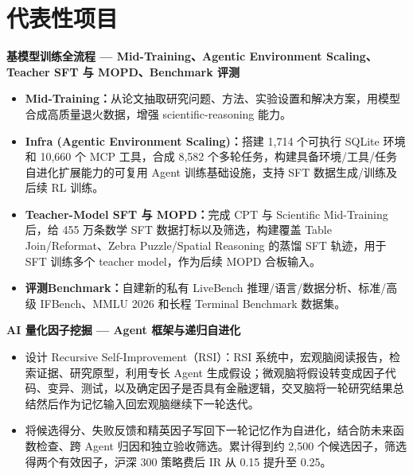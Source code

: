 \documentclass[9pt,a4paper]{ctexart}
\newcommand{\project}[1]{\vspace{1.5pt}\textbf{#1}\par}
\begin{document}
\section{代表性项目}
\project{基模型训练全流程 --- Mid-Training、Agentic Environment Scaling、Teacher SFT 与 MOPD、Benchmark 评测}
\begin{itemize}
  \item \textbf{Mid-Training：}从论文抽取研究问题、方法、实验设置和解决方案，用模型合成高质量退火数据，增强 scientific-reasoning 能力。
  \item \textbf{Infra (Agentic Environment Scaling)：}搭建 1,714 个可执行 SQLite 环境和 10,660 个 MCP 工具，合成 8,582 个多轮任务，构建具备环境/工具/任务自进化扩展能力的可复用 Agent 训练基础设施，支持 SFT 数据生成/训练及后续 RL 训练。
  \item \textbf{Teacher-Model SFT 与 MOPD：}完成 CPT 与 Scientific Mid-Training 后，给 455 万条数学 SFT 数据打标以及筛选，构建覆盖 Table Join/Reformat、Zebra Puzzle/Spatial Reasoning 的蒸馏 SFT 轨迹，用于 SFT 训练多个 teacher model，作为后续 MOPD 合板输入。
  \item \textbf{评测Benchmark：}自建新的私有 LiveBench 推理/语言/数据分析、标准/高级 IFBench、MMLU 2026 和长程 Terminal Benchmark 数据集。
\end{itemize}

\project{AI 量化因子挖掘 --- Agent 框架与递归自进化}
\begin{itemize}
  \item 设计 Recursive Self-Improvement（RSI）：RSI 系统中，宏观脑阅读报告，检索证据、研究原型，利用专长 Agent 生成假设；微观脑将假设转变成因子代码、变异、测试，以及确定因子是否具有金融逻辑，交叉脑将一轮研究结果总结然后作为记忆输入回宏观脑继续下一轮迭代。
  \item 将候选得分、失败反馈和精英因子写回下一轮记忆作为自进化，结合防未来函数检查、跨 Agent 归因和独立验收筛选。累计得到约 2,500 个候选因子，筛选得两个有效因子，沪深 300 策略费后 IR 从 0.15 提升至 0.25。
\end{itemize}
\end{document}
